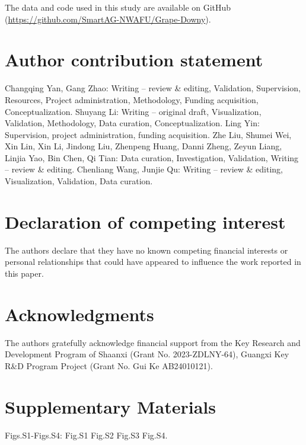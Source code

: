 \documentclass[
]{article}
\begin{document}
The data and code used in this study are available on GitHub
(\url{https://github.com/SmartAG-NWAFU/Grape-Downy}).

\hypertarget{author-contribution-statement}{%
\section*{Author contribution
statement}\label{author-contribution-statement}}

Changqing Yan, Gang Zhao: Writing -- review \& editing, Validation,
Supervision, Resources, Project administration, Methodology, Funding
acquisition, Conceptualization. Shuyang Li: Writing -- original draft,
Visualization, Validation, Methodology, Data curation,
Conceptualization. Ling Yin: Supervision, project administration,
funding acquisition. Zhe Liu, Shumei Wei, Xin Lin, Xin Li, Jindong Liu,
Zhenpeng Huang, Danni Zheng, Zeyun Liang, Linjia Yao, Bin Chen, Qi Tian:
Data curation, Investigation, Validation, Writing -- review \& editing.
Chenliang Wang, Junjie Qu: Writing -- review \& editing, Visualization,
Validation, Data curation.

\hypertarget{declaration-of-competing-interest}{%
\section*{Declaration of competing
interest}\label{declaration-of-competing-interest}}

The authors declare that they have no known competing financial
interests or personal relationships that could have appeared to
influence the work reported in this paper.

\hypertarget{acknowledgments}{%
\section*{Acknowledgments}\label{acknowledgments}}

The authors gratefully acknowledge financial support from the Key
Research and Development Program of Shaanxi (Grant No. 2023-ZDLNY-64),
Guangxi Key R\&D Program Project (Grant No. Gui Ke AB24010121).

\hypertarget{supplementary-materials}{%
\section*{Supplementary Materials}\label{supplementary-materials}}

\hypertarget{fig:S1}{}\hypertarget{fig:S2}{}\hypertarget{fig:S3}{}\hypertarget{fig:S4}{}Figs.S1-Figs.S4: Fig.S1 Fig.S2 Fig.S3 Fig.S4.
\end{document}
